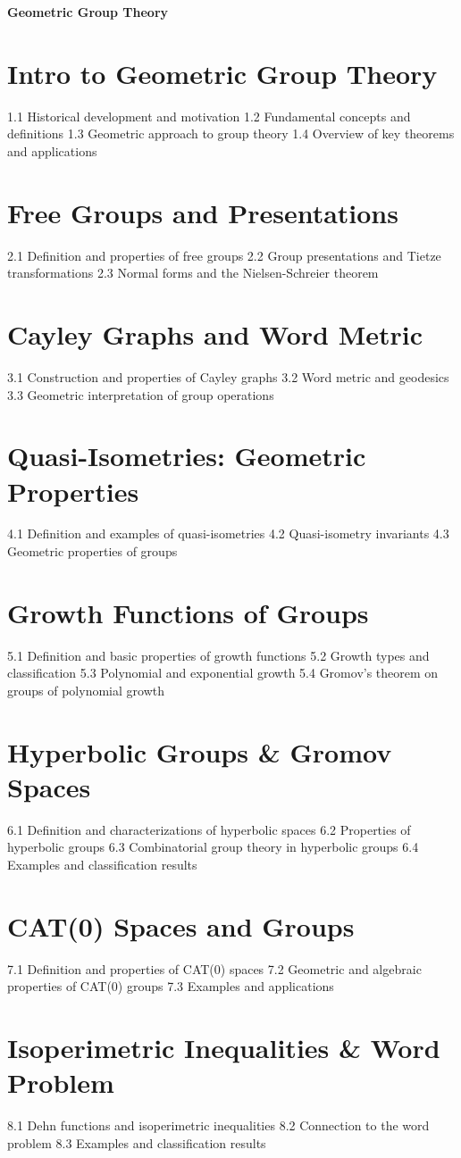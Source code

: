 {\LARGE \bf{Geometric Group Theory}}
\section{Intro to Geometric Group Theory}
1.1 Historical development and motivation
1.2 Fundamental concepts and definitions
1.3 Geometric approach to group theory
1.4 Overview of key theorems and applications
\section{Free Groups and Presentations}
2.1 Definition and properties of free groups
2.2 Group presentations and Tietze transformations
2.3 Normal forms and the Nielsen-Schreier theorem
\section{Cayley Graphs and Word Metric}
3.1 Construction and properties of Cayley graphs
3.2 Word metric and geodesics
3.3 Geometric interpretation of group operations
\section{Quasi-Isometries: Geometric Properties}
4.1 Definition and examples of quasi-isometries
4.2 Quasi-isometry invariants
4.3 Geometric properties of groups
\section{Growth Functions of Groups}
5.1 Definition and basic properties of growth functions
5.2 Growth types and classification
5.3 Polynomial and exponential growth
5.4 Gromov's theorem on groups of polynomial growth
\section{Hyperbolic Groups \& Gromov Spaces}
6.1 Definition and characterizations of hyperbolic spaces
6.2 Properties of hyperbolic groups
6.3 Combinatorial group theory in hyperbolic groups
6.4 Examples and classification results
\section{CAT(0) Spaces and Groups}
7.1 Definition and properties of CAT(0) spaces
7.2 Geometric and algebraic properties of CAT(0) groups
7.3 Examples and applications
\section{Isoperimetric Inequalities \& Word Problem}
8.1 Dehn functions and isoperimetric inequalities
8.2 Connection to the word problem
8.3 Examples and classification results
